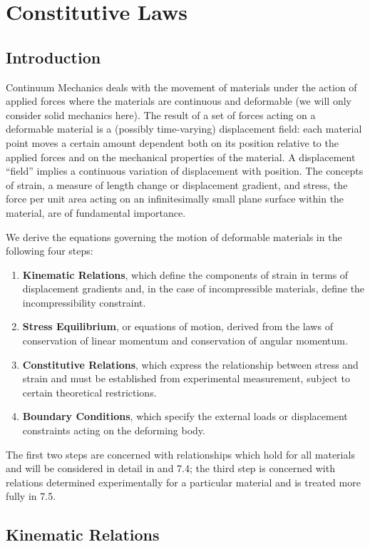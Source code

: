 \chapter{Constitutive Laws}

\section{Introduction}
Continuum Mechanics deals with the movement of materials under the action of
applied forces where the materials are continuous and deformable (we will only
consider solid mechanics here).  The result of a set of forces acting on a
deformable material is a (possibly time-varying) displacement field: each
material point moves a certain amount dependent both on its position relative
to the applied forces and on the mechanical properties of the material. A
displacement ``field'' implies a continuous variation of displacement with
position. The concepts of strain, a measure of length change or displacement
gradient, and stress, the force per unit area acting on an infinitesimally
small plane surface within the material, are of fundamental importance.

We derive the equations governing the motion of deformable
materials in the following four steps:
\begin{enumerate}
\item \textbf {Kinematic Relations}, which define the components of strain in
  terms of displacement gradients and, in the case of incompressible
  materials, define the incompressibility constraint.
\item \textbf {Stress Equilibrium}, or equations of motion, derived from the laws
  of conservation of linear momentum and conservation of angular momentum.
\item \textbf {Constitutive Relations}, which express the relationship between
  stress and strain and must be established from experimental measurement,
  subject to certain theoretical restrictions.
\item \textbf {Boundary Conditions}, which specify the external loads or
  displacement constraints acting on the deforming body.
\end{enumerate}
The first two steps are concerned with relationships which hold for all
materials and will be considered in detail in  and 7.4; the
third step is concerned with relations determined experimentally for a
particular material and is treated more fully in 7.5.
\section{Kinematic Relations}
\label{sec:Kinrel} 


